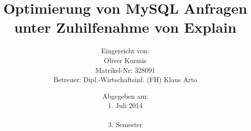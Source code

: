 
\begin{titlepage}
\titlehead{\large FOM Hochschule für Oekonomie \& Management Essen\\ 
Standort München\\
\normalsize Berufsbegleitender Studiengang zum B.Sc.\ Wirtschaftsinformatik}
\subject{\vspace{1cm}Seminararbeit}
\title{Optimierung von MySQL Anfragen unter Zuhilfenahme von Explain}
\author{
 {\normalsize Eingereicht von:}
   \\Oliver Kurmis\\
  {\normalsize Matrikel-Nr: 328091}\\
  {\normalsize Betreuer: Dipl.-Wirtschaftsinf. (FH) Klaus Arto}
}
\date{{\normalsize Abgegeben am:}\\1. Juli 2014\\\\3. Semester}


\end{titlepage}

\maketitle 

\thispagestyle{empty}
